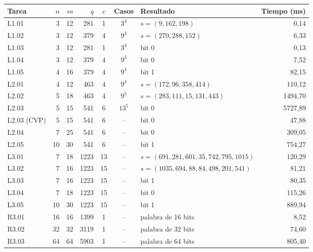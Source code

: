 \begin{tabular}{@{}lrrrcclr@{}}
\toprule
Tarea & $n$ & $m$ & $q$ & $c$ & Casos & Resultado & Tiempo (ms)\\
\midrule
L1.01 & 3 & 12 & 281 & 1 & $3^{3}$ & $s=(9,162,198)$ & 0{,}14 \\
L1.02 & 3 & 12 & 379 & 4 & $9^{3}$ & $s=(270,288,152)$ & 6{,}33 \\
L1.03 & 3 & 12 & 281 & 1 & $3^{3}$ & bit 0 & 0{,}13 \\
L1.04 & 3 & 12 & 379 & 4 & $9^{3}$ & bit 0 & 7{,}52 \\
L1.05 & 4 & 16 & 379 & 4 & $9^{4}$ & bit 1 & 82{,}15 \\
L2.01 & 4 & 12 & 463 & 4 & $9^{4}$ & $s=(172,96,358,414)$ & 110{,}12 \\
L2.02 & 5 & 18 & 463 & 4 & $9^{5}$ & $s=(283,111,15,131,443)$ & 1494{,}70 \\
L2.03 & 5 & 15 & 541 & 6 & $13^{5}$ & bit 0 & 5727{,}89 \\
\midrule
L2.03 (CVP) & 5 & 15 & 541 & 6 & -- & bit 0 & 47{,}88 \\
L2.04 & 7 & 25 & 541 & 6 & -- & bit 0 & 309{,}05 \\
L2.05 & 10 & 30 & 541 & 6 & -- & bit 1 & 754{,}27 \\
L3.01 & 7 & 18 & 1223 & 13 & -- & $s=(691,281,601,35,742,795,1015)$ & 120{,}29 \\
L3.02 & 7 & 16 & 1223 & 15 & -- & $s=(1035,694,88,84,498,201,541)$ & 81{,}21 \\
L3.03 & 7 & 16 & 1223 & 15 & -- & bit 1 & 80{,}35 \\
L3.04 & 7 & 18 & 1223 & 15 & -- & bit 0 & 115{,}26 \\
L3.05 & 10 & 30 & 1223 & 15 & -- & bit 1 & 889{,}94 \\
\midrule
R3.01 & 16 & 16 & 1399 & 1 & -- & palabra de 16 bits & 8{,}52 \\
R3.02 & 32 & 32 & 3119 & 1 & -- & palabra de 32 bits & 74{,}60 \\
R3.03 & 64 & 64 & 5903 & 1 & -- & palabra de 64 bits & 805{,}40 \\
\bottomrule
\end{tabular}
